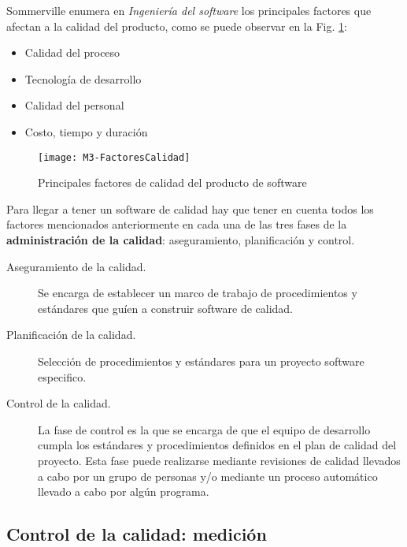 Sommerville enumera en \textit{Ingeniería del software} \cite{sommerville_ingenierisoftware_2002} los principales factores que afectan a la calidad del producto, como se puede observar en la Fig. \ref{fig:M3-FactoresCalidad}:
\begin{itemize}
	\tightlist
	\item Calidad del proceso
	\item Tecnología de desarrollo
	\item Calidad del personal
	\item Costo, tiempo y duración
\end{itemize}
\begin{figure}[!h]
	\centering
	\texttt{[image: M3-FactoresCalidad]}
	\caption{Principales factores de calidad del producto de software \cite{sommerville_ingenierisoftware_2002}}\label{fig:M3-FactoresCalidad}
\end{figure}
\FloatBarrier


Para llegar a tener un software de calidad hay que tener en cuenta todos los factores mencionados anteriormente en cada una de las tres fases de la \textbf{administración de la calidad}: aseguramiento, planificación y control.

\begin{description}
	\item[Aseguramiento de la calidad.] Se encarga de establecer un marco de trabajo de procedimientos y estándares que guíen a construir software de calidad.
	\item[Planificación de la calidad.] Selección de procedimientos y estándares para un proyecto software especifico.
	\item[Control de la calidad.] La fase de control es la que se encarga de que el equipo de desarrollo cumpla los estándares y procedimientos definidos en el plan de calidad del proyecto. Esta fase puede realizarse mediante revisiones de calidad llevados a cabo por un grupo de personas y/o mediante un proceso automático llevado a cabo por algún programa.
\end{description}


\subsection{Control de la calidad: medición}

